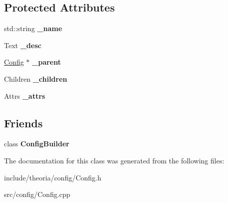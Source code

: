 \subsection*{Protected Attributes}
\begin{DoxyCompactItemize}
\item 
\hypertarget{classtheoria_1_1config_1_1Config_a3a4838b605d99ce710ec0ad4c5285e5d}{std\+::string {\bfseries \+\_\+name}}\label{classtheoria_1_1config_1_1Config_a3a4838b605d99ce710ec0ad4c5285e5d}

\item 
\hypertarget{classtheoria_1_1config_1_1Config_ab73d2f2163ddb788e877900ed075273e}{Text {\bfseries \+\_\+desc}}\label{classtheoria_1_1config_1_1Config_ab73d2f2163ddb788e877900ed075273e}

\item 
\hypertarget{classtheoria_1_1config_1_1Config_aecbf5fc3dcb43d90e8ebffd0650c3831}{\hyperlink{classtheoria_1_1config_1_1Config}{Config} $\ast$ {\bfseries \+\_\+parent}}\label{classtheoria_1_1config_1_1Config_aecbf5fc3dcb43d90e8ebffd0650c3831}

\item 
\hypertarget{classtheoria_1_1config_1_1Config_a51f52887f1e69984334896dc61b5846f}{Children {\bfseries \+\_\+children}}\label{classtheoria_1_1config_1_1Config_a51f52887f1e69984334896dc61b5846f}

\item 
\hypertarget{classtheoria_1_1config_1_1Config_a9ffb513d50db0712eb085f22c2c102b2}{Attrs {\bfseries \+\_\+attrs}}\label{classtheoria_1_1config_1_1Config_a9ffb513d50db0712eb085f22c2c102b2}

\end{DoxyCompactItemize}
\subsection*{Friends}
\begin{DoxyCompactItemize}
\item 
\hypertarget{classtheoria_1_1config_1_1Config_a3d61732fded713b38fc7f9fe3d80e2ae}{class {\bfseries Config\+Builder}}\label{classtheoria_1_1config_1_1Config_a3d61732fded713b38fc7f9fe3d80e2ae}

\end{DoxyCompactItemize}


The documentation for this class was generated from the following files\+:\begin{DoxyCompactItemize}
\item 
include/theoria/config/Config.\+h\item 
src/config/Config.\+cpp\end{DoxyCompactItemize}
